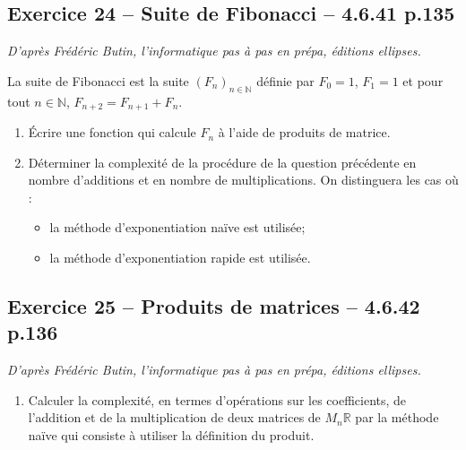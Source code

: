 \documentclass[10pt,fleqn]{article} %
\begin{document}
\begin{multicols}{2}
\subsection*{Exercice 24 -- Suite de Fibonacci -- 4.6.41 p.135}
\begin{flushright}
\textit{D'après Frédéric Butin, l'informatique pas à pas en prépa, éditions ellipses.}
\end{flushright}

La suite de Fibonacci est la suite $\left( F_n \right)_{n \in \mathbb{N}}$ définie par $F_0=1$, $F_1=1$ et pour tout $n\in \mathbb{N}$, $F_{n+2}=F_{n+1}+F_{n}$.

\begin{enumerate}
\item Écrire une fonction qui calcule $F_n$ à l'aide de produits de matrice.
\item Déterminer la complexité de la procédure de la question précédente en nombre d'additions et en nombre de multiplications. On distinguera les cas où :
\begin{itemize}
\item la méthode d'exponentiation naïve est utilisée;
\item la méthode d'exponentiation rapide est utilisée.
\end{itemize}
\end{enumerate}


\subsection*{Exercice 25 -- Produits de matrices -- 4.6.42 p.136}
\begin{flushright}
\textit{D'après Frédéric Butin, l'informatique pas à pas en prépa, éditions ellipses.}
\end{flushright}
\begin{enumerate}
\item Calculer la complexité, en termes d'opérations sur les coefficients, de l'addition et de la multiplication de deux matrices de $M_n\mathbb{R}$ par la méthode naïve qui consiste à utiliser la définition du produit.


\end{enumerate}
\end{multicols}
\end{document}
